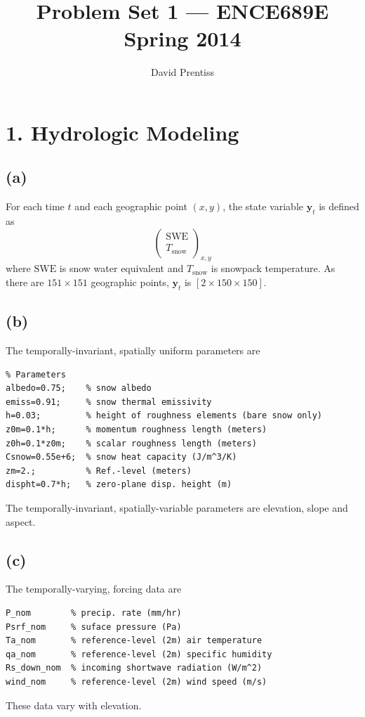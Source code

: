 \documentclass[fleqn, letterpaper]{tufte-handout}
\title{Problem Set 1 --- ENCE689E Spring 2014}
\author{David Prentiss}
\begin{document}
\maketitle


\section{1. Hydrologic Modeling}
\subsection{(a)}
For each time $t$ and each geographic point $(x,y)$, the state variable $\mathbf{y}_t$ is defined as
\[
	\begin{pmatrix}
		\text{SWE} \\
		T_{\text{snow}}
	\end{pmatrix}_{x,y}
\]
where $\text{SWE}$ is snow water equivalent and $T_{\text{snow}}$ is snowpack temperature. As there are $151\times151$ geographic points, $\mathbf{y}_t$ is $[2\times150\times150]$.

\subsection{(b)}
The temporally-invariant, spatially uniform parameters are
\begin{verbatim}
% Parameters
albedo=0.75;    % snow albedo
emiss=0.91;     % snow thermal emissivity
h=0.03;         % height of roughness elements (bare snow only)
z0m=0.1*h;      % momentum roughness length (meters)
z0h=0.1*z0m;    % scalar roughness length (meters)
Csnow=0.55e+6;  % snow heat capacity (J/m^3/K)
zm=2.;          % Ref.-level (meters)
dispht=0.7*h;   % zero-plane disp. height (m)
\end{verbatim}
The temporally-invariant, spatially-variable parameters are elevation, slope and aspect.

\subsection{(c)}
The temporally-varying, forcing data are
\begin{verbatim}
P_nom        % precip. rate (mm/hr)
Psrf_nom     % suface pressure (Pa)
Ta_nom       % reference-level (2m) air temperature
qa_nom       % reference-level (2m) specific humidity
Rs_down_nom  % incoming shortwave radiation (W/m^2)
wind_nom     % reference-level (2m) wind speed (m/s)
\end{verbatim}
These data vary with elevation.
\end{document}
